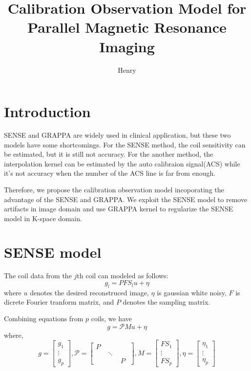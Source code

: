 \documentclass[UTF8]{article}
\begin{document}
\author{Henry}
\title{Calibration Observation Model for Parallel Magnetic Resonance Imaging}
\maketitle

\section{Introduction}
\par SENSE and GRAPPA are widely used in clinical application, but these two models have some shortcomings. For the SENSE method, the coil sensitivity can be estimated, but it is still not accuracy. For the another method, the interpolation kernel can be estimated by the auto calibraion signal(ACS) while it's not accuracy when the number of the ACS line is far from enough.
\par Therefore, we propose the calibration observation model incoporating the advantage of the SENSE and GRAPPA. We exploit the SENSE model to remove artifacts in image domain and use GRAPPA kernel to regularize the SENSE model in K-space domain.
\section{SENSE model}
\par The coil data from the $j$th coil can modeled as follows:
\begin{equation}\label{eq:coil_equation}
	g_l = PFS_lu + \eta
\end{equation}
where $u$ denotes the desired reconstruced image, $\eta$ is gaussian white noisy, $F$ is dicrete Fourier tranform matrix, and $P$ denotes the sampling matrix. 
\par Combining equations from $p$ coils, we have 
\begin{equation}\label{eq:system_equation}
	g = \mathcal{P}Mu + \eta
\end{equation}
where,
\begin{equation*}
	g = \begin{bmatrix}
		g_1 \\
		\vdots \\
		g_p
	\end{bmatrix},
   \mathcal{P} = \begin{bmatrix}
	   	P & \quad&\quad \\
	   	\quad& \ddots &\quad \\
	   	\quad& \quad& P
   \end{bmatrix},
	M = \begin{bmatrix}
		FS_1 \\
		\vdots \\
		FS_p
	\end{bmatrix},
	\eta =\begin{bmatrix}
		\eta_1 \\
		\vdots \\
		\eta_p
	\end{bmatrix}
\end{equation*}
\end{document}

